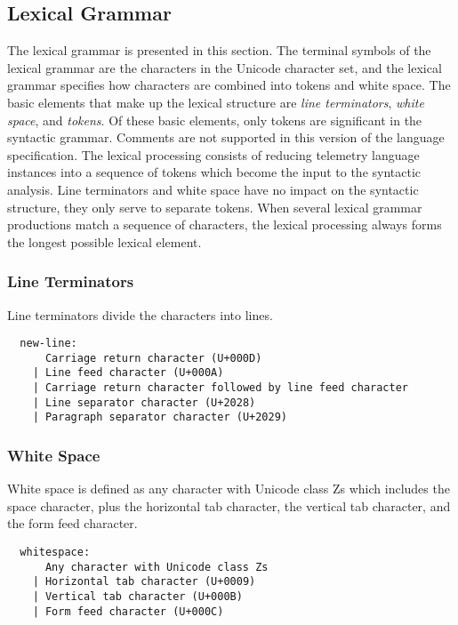 \subsection{Lexical Grammar}

The lexical grammar is presented in this section. The terminal symbols of the lexical grammar are the characters in the Unicode character set, and the lexical grammar specifies how characters are combined into tokens and white space. The basic elements that make up the lexical structure are \textit{line terminators}, \textit{white space}, and \textit{tokens}. Of these basic elements, only tokens are significant in the syntactic grammar. Comments are not supported in this version of the language specification. The lexical processing consists of reducing telemetry language instances into a sequence of tokens which become the input to the syntactic analysis. Line terminators and white space  have no impact on the syntactic structure, they only serve to separate tokens. When several lexical grammar productions match a sequence of characters, the lexical processing always forms the longest possible lexical element.


\subsubsection{Line Terminators}
Line terminators divide the characters into lines.
\begin{verbatim}
  new-line:
      Carriage return character (U+000D)
    | Line feed character (U+000A)
    | Carriage return character followed by line feed character
    | Line separator character (U+2028)
    | Paragraph separator character (U+2029)
\end{verbatim}


\subsubsection{White Space}
White space is defined as any character with Unicode class Zs which includes the space character, plus the horizontal tab character, the vertical tab character, and the form feed character.
\begin{verbatim}
  whitespace:
      Any character with Unicode class Zs
    | Horizontal tab character (U+0009)
    | Vertical tab character (U+000B)
    | Form feed character (U+000C)
\end{verbatim}


